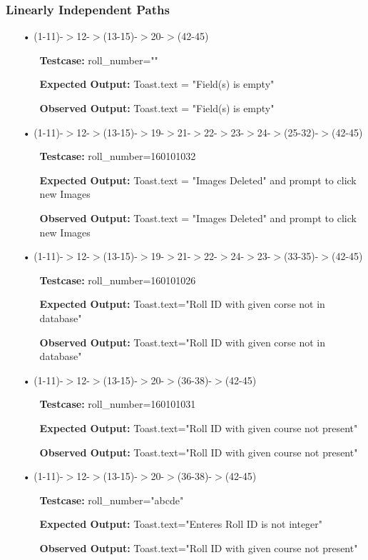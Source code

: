 \documentclass{scrreprt}
\begin{document}
\subsubsection{Linearly Independent Paths}
\begin{enumerate}
\item[•](1-11)-$>$12-$>$(13-15)-$>$20-$>$(42-45)
\begin{itemize}
\item[]\textbf{Testcase: }roll_number=""
\item[]\textbf{Expected Output: }Toast.text = "Field(s) is empty"
\item[]\textbf{Observed Output: }Toast.text = "Field(s) is empty"
\end{itemize}

\item[•](1-11)-$>$12-$>$(13-15)-$>$19-$>$21-$>$22-$>$23-$>$24-$>$(25-32)-$>$(42-45)
\begin{itemize}
\item[]\textbf{Testcase: }roll_number=160101032
\item[]\textbf{Expected Output: }Toast.text = "Images Deleted" and prompt to click new Images
\item[]\textbf{Observed Output: }Toast.text = "Images Deleted" and prompt to click new Images
\end{itemize}

\item[•](1-11)-$>$12-$>$(13-15)-$>$19-$>$21-$>$22-$>$24-$>$23-$>$(33-35)-$>$(42-45)
\begin{itemize}
\item[]\textbf{Testcase: }roll_number=160101026
\item[]\textbf{Expected Output: }Toast.text="Roll ID with given corse not in database"
\item[]\textbf{Observed Output: }Toast.text="Roll ID with given corse not in database"
\end{itemize}

\item[•](1-11)-$>$12-$>$(13-15)-$>$20-$>$(36-38)-$>$(42-45)
\begin{itemize}
\item[]\textbf{Testcase: }roll_number=160101031
\item[]\textbf{Expected Output: }Toast.text="Roll ID with given course not present"
\item[]\textbf{Observed Output: }Toast.text="Roll ID with given course not present"
\end{itemize}


\item[•](1-11)-$>$12-$>$(13-15)-$>$20-$>$(36-38)-$>$(42-45)
\begin{itemize}
\item[]\textbf{Testcase: }roll_number="abcde"
\item[]\textbf{Expected Output: }Toast.text="Enteres Roll ID is not integer"
\item[]\textbf{Observed Output: }Toast.text="Roll ID with given course not present"
\end{itemize}

\end{enumerate}	
\end{document}

